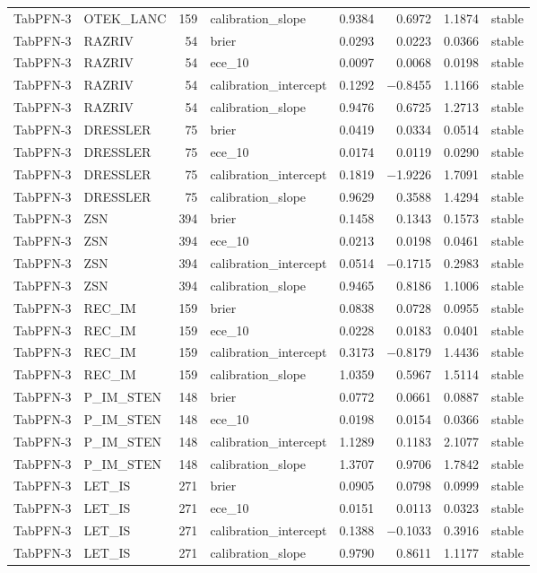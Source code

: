 \begin{longtable}{llrlrrrl}
TabPFN-3 & OTEK\_LANC & 159 & calibration\_slope & 0.9384 & 0.6972 & 1.1874 & stable \\
TabPFN-3 & RAZRIV & 54 & brier & 0.0293 & 0.0223 & 0.0366 & stable \\
TabPFN-3 & RAZRIV & 54 & ece\_10 & 0.0097 & 0.0068 & 0.0198 & stable \\
TabPFN-3 & RAZRIV & 54 & calibration\_intercept & 0.1292 & $-$0.8455 & 1.1166 & stable \\
TabPFN-3 & RAZRIV & 54 & calibration\_slope & 0.9476 & 0.6725 & 1.2713 & stable \\
TabPFN-3 & DRESSLER & 75 & brier & 0.0419 & 0.0334 & 0.0514 & stable \\
TabPFN-3 & DRESSLER & 75 & ece\_10 & 0.0174 & 0.0119 & 0.0290 & stable \\
TabPFN-3 & DRESSLER & 75 & calibration\_intercept & 0.1819 & $-$1.9226 & 1.7091 & stable \\
TabPFN-3 & DRESSLER & 75 & calibration\_slope & 0.9629 & 0.3588 & 1.4294 & stable \\
TabPFN-3 & ZSN & 394 & brier & 0.1458 & 0.1343 & 0.1573 & stable \\
TabPFN-3 & ZSN & 394 & ece\_10 & 0.0213 & 0.0198 & 0.0461 & stable \\
TabPFN-3 & ZSN & 394 & calibration\_intercept & 0.0514 & $-$0.1715 & 0.2983 & stable \\
TabPFN-3 & ZSN & 394 & calibration\_slope & 0.9465 & 0.8186 & 1.1006 & stable \\
TabPFN-3 & REC\_IM & 159 & brier & 0.0838 & 0.0728 & 0.0955 & stable \\
TabPFN-3 & REC\_IM & 159 & ece\_10 & 0.0228 & 0.0183 & 0.0401 & stable \\
TabPFN-3 & REC\_IM & 159 & calibration\_intercept & 0.3173 & $-$0.8179 & 1.4436 & stable \\
TabPFN-3 & REC\_IM & 159 & calibration\_slope & 1.0359 & 0.5967 & 1.5114 & stable \\
TabPFN-3 & P\_IM\_STEN & 148 & brier & 0.0772 & 0.0661 & 0.0887 & stable \\
TabPFN-3 & P\_IM\_STEN & 148 & ece\_10 & 0.0198 & 0.0154 & 0.0366 & stable \\
TabPFN-3 & P\_IM\_STEN & 148 & calibration\_intercept & 1.1289 & 0.1183 & 2.1077 & stable \\
TabPFN-3 & P\_IM\_STEN & 148 & calibration\_slope & 1.3707 & 0.9706 & 1.7842 & stable \\
TabPFN-3 & LET\_IS & 271 & brier & 0.0905 & 0.0798 & 0.0999 & stable \\
TabPFN-3 & LET\_IS & 271 & ece\_10 & 0.0151 & 0.0113 & 0.0323 & stable \\
TabPFN-3 & LET\_IS & 271 & calibration\_intercept & 0.1388 & $-$0.1033 & 0.3916 & stable \\
TabPFN-3 & LET\_IS & 271 & calibration\_slope & 0.9790 & 0.8611 & 1.1177 & stable \\
\end{longtable}
